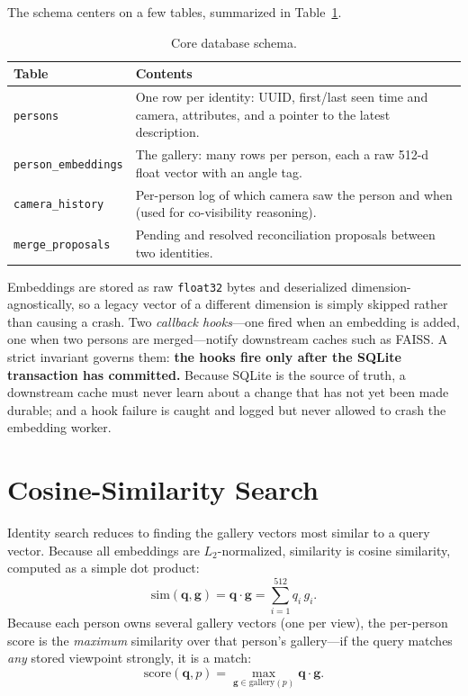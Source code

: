 \documentclass[12pt]{report}
\begin{document}
The schema centers on a few tables, summarized in Table~\ref{tab:schema}.

\begin{table}[H]
\centering
\begin{tabularx}{\textwidth}{|l|X|}
\hline
\textbf{Table} & \textbf{Contents} \\
\hline
\texttt{persons} & One row per identity: UUID, first/last seen time and camera, attributes, and a pointer to the latest description. \\
\hline
\texttt{person\_embeddings} & The gallery: many rows per person, each a raw 512-d float vector with an angle tag. \\
\hline
\texttt{camera\_history} & Per-person log of which camera saw the person and when (used for co-visibility reasoning). \\
\hline
\texttt{merge\_proposals} & Pending and resolved reconciliation proposals between two identities. \\
\hline
\end{tabularx}
\caption{Core database schema.}
\label{tab:schema}
\end{table}

Embeddings are stored as raw \texttt{float32} bytes and deserialized dimension-agnostically, so a legacy vector of a different dimension is simply skipped rather than causing a crash. Two \emph{callback hooks}---one fired when an embedding is added, one when two persons are merged---notify downstream caches such as FAISS. A strict invariant governs them: \textbf{the hooks fire only after the SQLite transaction has committed.} Because SQLite is the source of truth, a downstream cache must never learn about a change that has not yet been made durable; and a hook failure is caught and logged but never allowed to crash the embedding worker.

\section{Cosine-Similarity Search}
Identity search reduces to finding the gallery vectors most similar to a query vector. Because all embeddings are $L_2$-normalized, similarity is cosine similarity, computed as a simple dot product:
\[
\text{sim}(\mathbf{q}, \mathbf{g}) = \mathbf{q} \cdot \mathbf{g} = \sum_{i=1}^{512} q_i\, g_i .
\]
Because each person owns several gallery vectors (one per view), the per-person score is the \emph{maximum} similarity over that person's gallery---if the query matches \emph{any} stored viewpoint strongly, it is a match:
\[
\text{score}(\mathbf{q}, p) = \max_{\mathbf{g} \in \text{gallery}(p)} \mathbf{q} \cdot \mathbf{g} .
\]
\end{document}
